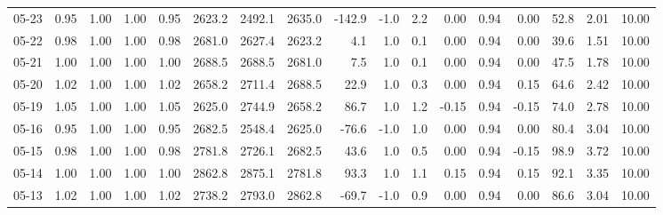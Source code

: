 \begin{threeparttable}
{\begin{tabular}{lrrrrrrrrrrrrrrrr}
  05-23 &         0.95 &           1.00 &          1.00 &          0.95 & 2623.2 & 2492.1 & 2635.0 &     -142.9 &                     -1.0 &                 2.2 &       0.00 &      0.94 &           0.00 &             52.8 &            2.01 &                  10.00 \\
  05-22 &         0.98 &           1.00 &          1.00 &          0.98 & 2681.0 & 2627.4 & 2623.2 &        4.1 &                      1.0 &                 0.1 &       0.00 &      0.94 &           0.00 &             39.6 &            1.51 &                  10.00 \\
  05-21 &         1.00 &           1.00 &          1.00 &          1.00 & 2688.5 & 2688.5 & 2681.0 &        7.5 &                      1.0 &                 0.1 &       0.00 &      0.94 &           0.00 &             47.5 &            1.78 &                  10.00 \\
  05-20 &         1.02 &           1.00 &          1.00 &          1.02 & 2658.2 & 2711.4 & 2688.5 &       22.9 &                      1.0 &                 0.3 &       0.00 &      0.94 &           0.15 &             64.6 &            2.42 &                  10.00 \\
  05-19 &         1.05 &           1.00 &          1.00 &          1.05 & 2625.0 & 2744.9 & 2658.2 &       86.7 &                      1.0 &                 1.2 &      -0.15 &      0.94 &          -0.15 &             74.0 &            2.78 &                  10.00 \\
  05-16 &         0.95 &           1.00 &          1.00 &          0.95 & 2682.5 & 2548.4 & 2625.0 &      -76.6 &                     -1.0 &                 1.0 &       0.00 &      0.94 &           0.00 &             80.4 &            3.04 &                  10.00 \\
  05-15 &         0.98 &           1.00 &          1.00 &          0.98 & 2781.8 & 2726.1 & 2682.5 &       43.6 &                      1.0 &                 0.5 &       0.00 &      0.94 &          -0.15 &             98.9 &            3.72 &                  10.00 \\
  05-14 &         1.00 &           1.00 &          1.00 &          1.00 & 2862.8 & 2875.1 & 2781.8 &       93.3 &                      1.0 &                 1.1 &       0.15 &      0.94 &           0.15 &             92.1 &            3.35 &                  10.00 \\
  05-13 &         1.02 &           1.00 &          1.00 &          1.02 & 2738.2 & 2793.0 & 2862.8 &      -69.7 &                     -1.0 &                 0.9 &       0.00 &      0.94 &           0.00 &             86.6 &            3.04 &                  10.00 \\

\end{tabular}}
\end{threeparttable}
